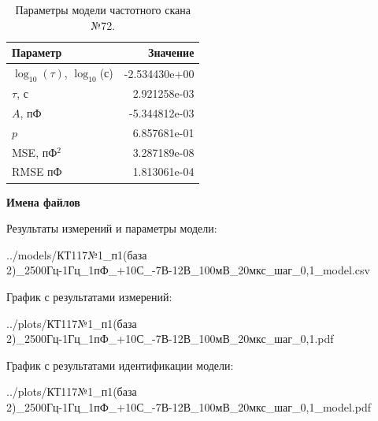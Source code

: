 \begin{table}[!ht]
    \centering
    \caption{Параметры модели частотного скана №72.}
    \begin{tabular}{|l|r|}
        \hline
        Параметр                                       & Значение                  \\ \hline
        $\log_{10}(\tau)$, $\log_{10}$(с)              & -2.534430e+00             \\ \hline
        $\tau$, с                                      & 2.921258e-03              \\ \hline
        $A$, пФ                                        & -5.344812e-03             \\ \hline
        $p$                                            & 6.857681e-01              \\ \hline
        MSE, пФ$^2$                                    & 3.287189e-08              \\ \hline
        RMSE пФ                                        & 1.813061e-04              \\ \hline
    \end{tabular}
    \label{table:frequency_scan_model_72}
\end{table}

\textbf{Имена файлов}

Результаты измерений и параметры модели:

\scriptsize../models/КТ117№1\_п1(база 2)\_2500Гц-1Гц\_1пФ\_+10С\_-7В-12В\_100мВ\_20мкс\_шаг\_0,1\_model.csv
\normalsize

График с результатами измерений:

\scriptsize../plots/КТ117№1\_п1(база 2)\_2500Гц-1Гц\_1пФ\_+10С\_-7В-12В\_100мВ\_20мкс\_шаг\_0,1.pdf
\normalsize

График с результатами идентификации модели:

\scriptsize../plots/КТ117№1\_п1(база 2)\_2500Гц-1Гц\_1пФ\_+10С\_-7В-12В\_100мВ\_20мкс\_шаг\_0,1\_model.pdf
\normalsize

